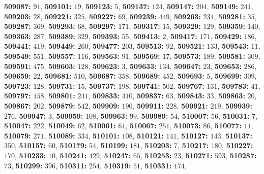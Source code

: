 \textsf{\bfseries 509087:} $91$, \textsf{\bfseries 509101:} $19$, \textsf{\bfseries 509123:} $5$, \textsf{\bfseries 509137:} $124$, \textsf{\bfseries 509147:} $204$, \textsf{\bfseries 509149:} $241$, \textsf{\bfseries 509203:} $28$, \textsf{\bfseries 509221:} $325$, \textsf{\bfseries 509227:} $69$, \textsf{\bfseries 509239:} $449$, \textsf{\bfseries 509263:} $231$, \textsf{\bfseries 509281:} $35$, \textsf{\bfseries 509287:} $369$, \textsf{\bfseries 509293:} $68$, \textsf{\bfseries 509297:} $171$, \textsf{\bfseries 509317:} $15$, \textsf{\bfseries 509329:} $129$, \textsf{\bfseries 509359:} $140$, \textsf{\bfseries 509363:} $287$, \textsf{\bfseries 509389:} $329$, \textsf{\bfseries 509393:} $55$, \textsf{\bfseries 509413:} $2$, \textsf{\bfseries 509417:} $171$, \textsf{\bfseries 509429:} $186$, \textsf{\bfseries 509441:} $419$, \textsf{\bfseries 509449:} $260$, \textsf{\bfseries 509477:} $203$, \textsf{\bfseries 509513:} $92$, \textsf{\bfseries 509521:} $133$, \textsf{\bfseries 509543:} $11$, \textsf{\bfseries 509549:} $551$, \textsf{\bfseries 509557:} $116$, \textsf{\bfseries 509563:} $91$, \textsf{\bfseries 509569:} $17$, \textsf{\bfseries 509573:} $189$, \textsf{\bfseries 509581:} $309$, \textsf{\bfseries 509591:} $475$, \textsf{\bfseries 509603:} $128$, \textsf{\bfseries 509623:} $3$, \textsf{\bfseries 509633:} $134$, \textsf{\bfseries 509647:} $23$, \textsf{\bfseries 509653:} $286$, \textsf{\bfseries 509659:} $22$, \textsf{\bfseries 509681:} $510$, \textsf{\bfseries 509687:} $358$, \textsf{\bfseries 509689:} $452$, \textsf{\bfseries 509693:} $5$, \textsf{\bfseries 509699:} $309$, \textsf{\bfseries 509723:} $128$, \textsf{\bfseries 509731:} $15$, \textsf{\bfseries 509737:} $198$, \textsf{\bfseries 509741:} $502$, \textsf{\bfseries 509767:} $131$, \textsf{\bfseries 509783:} $41$, \textsf{\bfseries 509797:} $158$, \textsf{\bfseries 509801:} $241$, \textsf{\bfseries 509833:} $410$, \textsf{\bfseries 509837:} $63$, \textsf{\bfseries 509843:} $33$, \textsf{\bfseries 509863:} $20$, \textsf{\bfseries 509867:} $202$, \textsf{\bfseries 509879:} $542$, \textsf{\bfseries 509909:} $190$, \textsf{\bfseries 509911:} $228$, \textsf{\bfseries 509921:} $219$, \textsf{\bfseries 509939:} $276$, \textsf{\bfseries 509947:} $3$, \textsf{\bfseries 509959:} $108$, \textsf{\bfseries 509963:} $99$, \textsf{\bfseries 509989:} $54$, \textsf{\bfseries 510007:} $56$, \textsf{\bfseries 510031:} $7$, \textsf{\bfseries 510047:} $222$, \textsf{\bfseries 510049:} $62$, \textsf{\bfseries 510061:} $61$, \textsf{\bfseries 510067:} $251$, \textsf{\bfseries 510073:} $86$, \textsf{\bfseries 510077:} $11$, \textsf{\bfseries 510079:} $271$, \textsf{\bfseries 510089:} $334$, \textsf{\bfseries 510101:} $108$, \textsf{\bfseries 510121:} $141$, \textsf{\bfseries 510127:} $143$, \textsf{\bfseries 510137:} $350$, \textsf{\bfseries 510157:} $60$, \textsf{\bfseries 510179:} $54$, \textsf{\bfseries 510199:} $181$, \textsf{\bfseries 510203:} $7$, \textsf{\bfseries 510217:} $180$, \textsf{\bfseries 510227:} $170$, \textsf{\bfseries 510233:} $10$, \textsf{\bfseries 510241:} $429$, \textsf{\bfseries 510247:} $65$, \textsf{\bfseries 510253:} $23$, \textsf{\bfseries 510271:} $593$, \textsf{\bfseries 510287:} $73$, \textsf{\bfseries 510299:} $396$, \textsf{\bfseries 510311:} $254$, \textsf{\bfseries 510319:} $51$, \textsf{\bfseries 510331:} $174$, 
